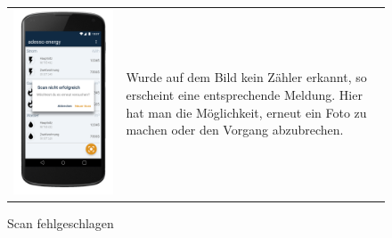 \begin{figure}[h]
\begin{tabularx}{\textwidth}{X  X}
	\includegraphics[scale = 0.155]{img/AndroidMockup/imageFailed} \caption{Scan fehlgeschlagen} & Wurde auf dem Bild kein Zähler erkannt, so erscheint eine entsprechende Meldung. Hier hat man die Möglichkeit, erneut ein Foto zu machen oder den Vorgang abzubrechen. \\

\end{tabularx}
\end{figure}
